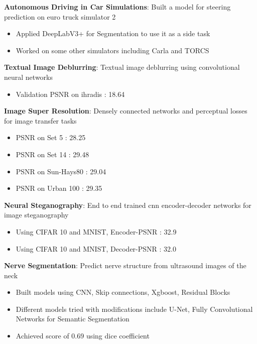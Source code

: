 \documentclass[letterpaper,11pt]{article}
\newcommand{\resumeItem}[2]{
  \item\small{
    \textbf{#1}{: #2 \vspace{-2pt}}
  }
}
\newcommand{\resumeSubItem}[2]{\resumeItem{#1}{#2}\vspace{-4pt}}
\begin{document}
           \resumeSubItem{Autonomous Driving in Car Simulations}
      {Built a model for steering prediction on euro truck simulator 2}
      \begin{itemize}
\item Applied DeepLabV3+ for Segmentation to use it as a side task
\item Worked on some other simulators including Carla and TORCS
			\end{itemize}
      
      


    \resumeSubItem{Textual Image Deblurring}
      {Textual image deblurring using convolutional neural networks}

 \begin{itemize}
      \item Validation PSNR on ihradis : 18.64
			\end{itemize}
    \resumeSubItem{Image Super Resolution}
      {Densely connected networks and perceptual losses for
image transfer tasks}






 \begin{itemize}
      \item PSNR on Set 5 : 28.25
      \item PSNR on Set 14 : 29.48
      \item PSNR on Sun-Hays80 : 29.04
      \item PSNR on Urban 100 : 29.35
			\end{itemize}
			
			 \resumeSubItem{Neural Steganography}
      {End to end trained cnn encoder-decoder networks for
image steganography}






 \begin{itemize}
      \item Using CIFAR 10 and MNIST, Encoder-PSNR : 32.9
      \item Using CIFAR 10 and MNIST, Decoder-PSNR : 32.0
      
			\end{itemize}
			   \resumeSubItem{Nerve Segmentation}
      {Predict nerve structure from ultrasound images of the
neck}






 \begin{itemize}
      \item Built models using CNN, Skip connections, Xgboost, Residual Blocks
      \item Different models tried with modifications include U-Net, Fully
Convolutional Networks for Semantic Segmentation
      \item Achieved score of 0.69 using dice coefficient
      
      
			\end{itemize}
			
\end{document}
